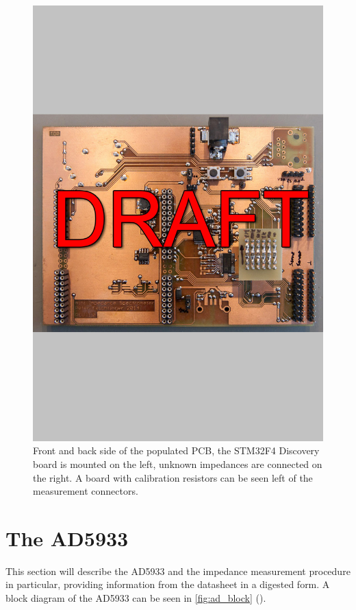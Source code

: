 \begin{figure}[htpb]
  \centering
    \includegraphics[width=\textwidth]{bilder/pcb_frontback.jpg}
  \caption{Front and back side of the populated PCB, the STM32F4 Discovery board is mounted on the left, unknown
    impedances are connected on the right. A board with calibration resistors can be seen left of the measurement
    connectors.}
  \label{fig:pcb_frontback}
\end{figure}


\section{The AD5933}

This section will describe the AD5933 and the impedance measurement procedure in particular, providing information
from the datasheet\footnotemark{} in a digested form.
A block diagram of the AD5933 can be seen in \autoref{fig:ad_block} ().

